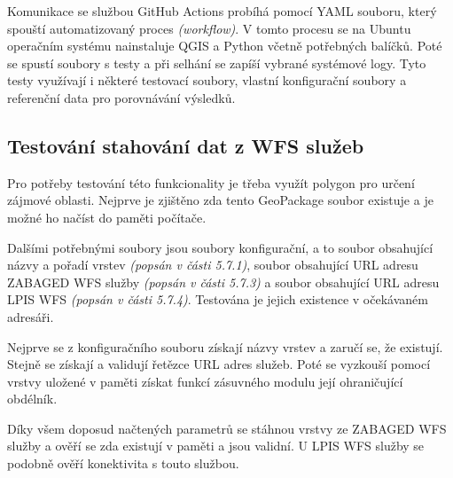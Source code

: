 \documentclass[a4paper,oneside,12pt]{book}
\begin{document}
\hspace{10mm} Komunikace se službou GitHub Actions probíhá pomocí YAML souboru, který spouští automatizovaný proces\textit{ (workflow)}. V tomto procesu se na Ubuntu operačním systému nainstaluje QGIS a Python včetně potřebných balíčků. Poté se spustí soubory s testy a při selhání se zapíší vybrané systémové logy. Tyto testy využívají i některé testovací soubory, vlastní konfigurační soubory a referenční data pro porovnávání výsledků.

\subsection{Testování stahování dat z WFS služeb} \label{test_WFS}
\hspace{10mm} Pro potřeby testování této funkcionality je třeba využít polygon pro určení zájmové oblasti. Nejprve je zjištěno zda tento GeoPackage soubor existuje a je možné ho načíst do paměti počítače. 

\hspace{10mm} Dalšími potřebnými soubory jsou soubory konfigurační, a to soubor obsahující názvy
a pořadí vrstev \textit{(popsán v části 5.7.1)}, soubor obsahující URL adresu ZABAGED WFS služby \textit{(popsán v části 5.7.3)} a soubor obsahující URL adresu LPIS WFS \textit{(popsán v části 5.7.4)}. Testována je jejich existence v očekávaném adresáři.

\hspace{10mm} Nejprve se z konfiguračního souboru získají názvy vrstev a zaručí se, že existují.
Stejně se získají a validují řetězce URL adres služeb. Poté se vyzkouší pomocí vrstvy uložené v paměti získat funkcí zásuvného modulu její ohraničující obdélník.

\hspace{10mm} Díky všem doposud načtených parametrů se stáhnou vrstvy ze ZABAGED WFS služby a ověří se zda existují v paměti a jsou validní. U LPIS WFS služby se podobně ověří konektivita s touto službou.
\end{document}
